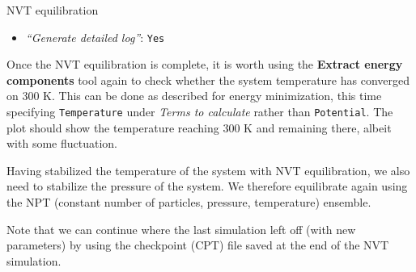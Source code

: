 \documentclass[twocolumn]{bmcart}%
\providecommand{\tightlist}{%
  \setlength{\itemsep}{0pt}\setlength{\parskip}{0pt}}
\begin{document}
\begin{handson_box_colour}{NVT
equilibration}
\begin{itemize}
\begin{itemize}
      \begin{itemize}
      \tightlist
      \item
        \emph{``Bond constraints (constraints)''}:
        \texttt{All\ bonds\ (all-bonds).}
      \item
        \emph{``Temperature /K''}: \texttt{300}
      \item
        \emph{``Step length in ps''}: \texttt{0.0002}
      \item
        \emph{``Number of steps that elapse between saving data points
        (velocities, forces, energies)''}: \texttt{1000}
      \item
        \emph{``Number of steps for the simulation''}: \texttt{50000}
      \end{itemize}
    \end{itemize}
  \item
    \emph{``Generate detailed log''}: \texttt{Yes}
  \end{itemize}

\end{handson_box_colour}

Once the NVT equilibration is complete, it is worth using the \textbf{Extract energy components} tool again to check whether the system temperature has converged on 300 K. This can be done as described for energy minimization, this time specifying \texttt{Temperature} under \emph{Terms to calculate} rather than \texttt{Potential}. The plot should show the temperature reaching 300 K and remaining there, albeit with some fluctuation.

Having stabilized the temperature of the system with NVT equilibration,
we also need to stabilize the pressure of the system. We therefore
equilibrate again using the NPT (constant number of particles, pressure,
temperature) ensemble.

Note that we can continue where the last simulation left off (with new
parameters) by using the checkpoint (CPT) file saved at the end of the
NVT simulation.
\end{document}
